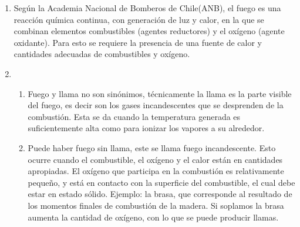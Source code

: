 \begin{enumerate}
  \item Según la Academia Nacional de Bomberos de Chile(ANB), el fuego es una reacción química continua, con generación de luz y calor, en la que se combinan elementos combustibles (agentes reductores) y el oxígeno (agente oxidante). Para esto se requiere la presencia de una fuente de calor y cantidades adecuadas de combustibles y oxígeno. 
  \item %
  \begin{enumerate}
      \item Fuego y llama no son sinónimos, técnicamente la llama es la parte visible del fuego, es decir son los gases incandescentes que se desprenden de la combustión. Esta se da cuando la temperatura generada es suficientemente alta como para ionizar los vapores a su alrededor. 
      \item Puede haber fuego sin llama, este se llama fuego incandescente. Esto ocurre cuando el combustible, el oxígeno y el calor están en cantidades apropiadas. El oxígeno que participa en la combustión es relativamente pequeño, y está en contacto con la superficie del combustible, el cual debe estar en estado sólido.  Ejemplo: la brasa, que corresponde al resultado de los momentos finales de combustión de la madera. Si soplamos la brasa aumenta la cantidad de oxígeno, con lo que se puede producir llamas.  
  \end{enumerate}
  

\end{enumerate}
